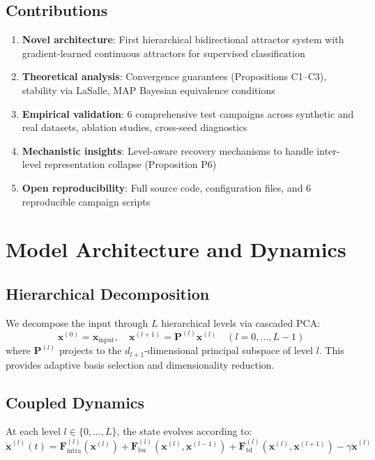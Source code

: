 \documentclass[11pt,a4paper]{article}
\begin{document}
\subsection{Contributions}

\begin{enumerate}
  \item \textbf{Novel architecture}: First hierarchical bidirectional attractor system with gradient-learned continuous attractors for supervised classification
  \item \textbf{Theoretical analysis}: Convergence guarantees (Propositions C1–C3), stability via LaSalle, MAP Bayesian equivalence conditions
  \item \textbf{Empirical validation}: 6 comprehensive test campaigns across synthetic and real datasets, ablation studies, cross-seed diagnostics
  \item \textbf{Mechanistic insights}: Level-aware recovery mechanisms to handle inter-level representation collapse (Proposition P6)
  \item \textbf{Open reproducibility}: Full source code, configuration files, and 6 reproducible campaign scripts
\end{enumerate}

\section{Model Architecture and Dynamics}

\subsection{Hierarchical Decomposition}

We decompose the input through $L$ hierarchical levels via cascaded PCA:
\begin{equation}
\mathbf{x}^{(0)} = \mathbf{x}_{\text{input}}, \quad \mathbf{x}^{(l+1)} = \mathbf{P}^{(l)} \mathbf{x}^{(l)} \quad (l=0,\ldots,L-1)
\end{equation}
where $\mathbf{P}^{(l)}$ projects to the $d_{l+1}$-dimensional principal subspace of level $l$. This provides adaptive basis selection and dimensionality reduction.

\subsection{Coupled Dynamics}

At each level $l \in \{0, \ldots, L\}$, the state evolves according to:
\begin{equation}
\dot{\mathbf{x}}^{(l)}(t) = \mathbf{F}^{(l)}_{\text{intra}}(\mathbf{x}^{(l)}) + \mathbf{F}^{(l)}_{\text{bu}}(\mathbf{x}^{(l)}, \mathbf{x}^{(l-1)}) + \mathbf{F}^{(l)}_{\text{td}}(\mathbf{x}^{(l)}, \mathbf{x}^{(l+1)}) - \gamma \dot{\mathbf{x}}^{(l)}
\label{eq:dynamics}
\end{equation}
\end{document}
